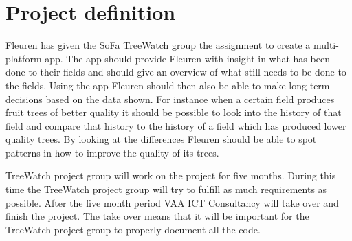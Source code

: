 \section {Project definition}
Fleuren has given the SoFa TreeWatch group the assignment to create a multi-platform app. The app should provide Fleuren with insight in what has been done to their fields and should give an overview of what still needs to be done to the fields. Using the app Fleuren should then also be able to make long term decisions based on the data shown. For instance when a certain field produces fruit trees of better quality it should be possible to look into the history of that field and compare that history to the history of a field which has produced lower quality trees. By looking at the differences Fleuren should be able to spot patterns in how to improve the quality of its trees.

TreeWatch project group will work on the project for five months. During this time the TreeWatch project group will try to fulfill as much requirements as possible. After the five month period VAA ICT Consultancy will take over and finish the project. The take over means that it will be important for the TreeWatch project group to properly document all the code.



